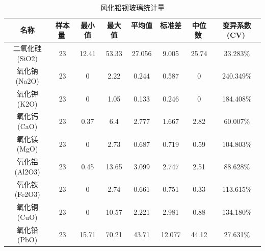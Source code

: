\documentclass{my_paper}
\begin{document}
\begin{enumerate}
\begin{itemize}
    \begin{table}[ht]
        \centering
        \caption{风化铅钡玻璃统计量}
        \begin{tabular}{cccccccc}
        \toprule
        名称                   & 样本量                 & 最小值                  & 最大值                  & 平均值                 & 标准差                 & 中位数                 & 变异系数(CV)            \\
        \midrule
        二氧化硅(SiO2)           & 23                   & 12.41                & 53.33                & 27.056               & 9.005                & 25.74                & 33.283\%             \\
        氧化钠(Na2O)            & 23                   & 0                    & 2.22                 & 0.244                & 0.587                & 0                    & 240.349\%            \\
        氧化钾(K2O)             & 23                   & 0                    & 1.05                 & 0.133                & 0.246                & 0                    & 184.408\%            \\
        氧化钙(CaO)             & 23                   & 0.37                 & 6.4                  & 2.777                & 1.667                & 2.82                 & 60.007\%             \\
        氧化镁(MgO)             & 23                   & 0                    & 2.73                 & 0.687                & 0.719                & 0.59                 & 104.803\%            \\
        氧化铝(Al2O3)           & 23                   & 0.45                 & 13.65                & 3.099                & 2.747                & 2.51                 & 88.628\%             \\
        氧化铁(Fe2O3)           & 23                   & 0                    & 2.74                 & 0.661                & 0.751                & 0.33                 & 113.615\%            \\
        氧化铜(CuO)             & 23                   & 0                    & 10.57                & 2.221                & 2.981                & 0.88                 & 134.180\%            \\
        氧化铅(PbO)             & 23                   & 15.71                & 70.21                & 43.71                & 12.077               & 44.12                & 27.631\%             \\

\end{tabular}
\end{table}
\end{itemize}
\end{enumerate}
\end{document}
